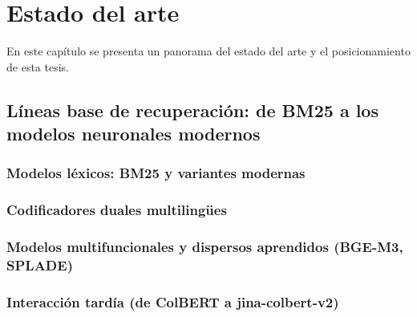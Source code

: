 \chapter{Estado del arte}\label{cap:edoarte}

En este capítulo se presenta un panorama del estado del arte y el posicionamiento de esta tesis.

\section{Líneas base de recuperación: de BM25 a los modelos neuronales modernos}\label{sec:edoarte-lineas-base}

\subsection{Modelos léxicos: BM25 y variantes modernas}\label{subsec:edoarte-bm25}

\subsection{Codificadores duales multilingües}\label{subsec:edoarte-duales}

\subsection{Modelos multifuncionales y dispersos aprendidos (BGE-M3, SPLADE)}\label{subsec:edoarte-multifuncionales}

\subsection{Interacción tardía (de ColBERT a jina-colbert-v2)}\label{subsec:edoarte-tardia}

